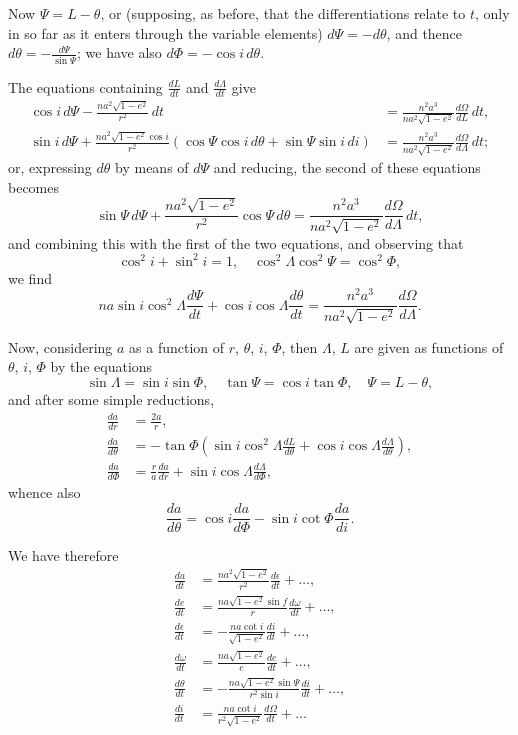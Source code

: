 \documentclass[12pt,a4paper]{article}
\theoremstyle{plain}
\begin{document}
Now $\Psi = L - \theta$, or (supposing, as before, that the differentiations relate to $t$, only in so far as it enters through the variable elements) $d\Psi = -d\theta$, and thence $d\theta = -\frac{d\Psi}{\sin\Psi}$; we have also $d\Phi = -\cos i\, d\theta$.

The equations containing $\frac{dL}{dt}$ and $\frac{d\Lambda}{dt}$ give
\begin{align*}
\cos i\, d\Psi - \frac{na^2\sqrt{1-e^2}}{r^2}\, dt &= \frac{n^2a^3}{na^2\sqrt{1-e^2}}\frac{d\Omega}{dL}\, dt, \\
\sin i\, d\Psi + \frac{na^2\sqrt{1-e^2}\cos i}{r^2}(\cos\Psi\cos i\, d\theta + \sin\Psi\sin i\, di) &= \frac{n^2a^3}{na^2\sqrt{1-e^2}}\frac{d\Omega}{d\Lambda}\, dt;
\end{align*}
or, expressing $d\theta$ by means of $d\Psi$ and reducing, the second of these equations becomes
\[
\sin\Psi\, d\Psi + \frac{na^2\sqrt{1-e^2}}{r^2}\cos\Psi\, d\theta = \frac{n^2a^3}{na^2\sqrt{1-e^2}}\frac{d\Omega}{d\Lambda}\, dt,
\]
and combining this with the first of the two equations, and observing that
\[
\cos^2 i + \sin^2 i = 1, \quad \cos^2\Lambda\cos^2\Psi = \cos^2\Phi,
\]
we find
\[
na\sin i\cos^2\Lambda\frac{d\Psi}{dt} + \cos i\cos\Lambda\frac{d\theta}{dt} = \frac{n^2a^3}{na^2\sqrt{1-e^2}}\frac{d\Omega}{d\Lambda}.
\]

Now, considering $a$ as a function of $r$, $\theta$, $i$, $\Phi$, then $\Lambda$, $L$ are given as functions of $\theta$, $i$, $\Phi$ by the equations
\[
\sin\Lambda = \sin i\sin\Phi, \quad \tan\Psi = \cos i\tan\Phi, \quad \Psi = L - \theta,
\]
and after some simple reductions,
\begin{align*}
\frac{da}{dr} &= \frac{2a}{r}, \\
\frac{da}{d\theta} &= -\tan\Phi(\sin i\cos^2\Lambda\frac{dL}{d\theta} + \cos i\cos\Lambda\frac{d\Lambda}{d\theta}), \\
\frac{da}{d\Phi} &= \frac{r}{a}\frac{da}{dr} + \sin i\cos\Lambda\frac{d\Lambda}{d\Phi},
\end{align*}
whence also
\[
\frac{da}{d\theta} = \cos i\frac{da}{d\Phi} - \sin i\cot\Phi\frac{da}{di}.
\]

We have therefore
\begin{align*}
\frac{da}{dt} &= \frac{na^2\sqrt{1-e^2}}{r^2}\frac{d\epsilon}{dt} + \ldots, \\
\frac{de}{dt} &= \frac{na\sqrt{1-e^2}\sin f}{r}\frac{d\omega}{dt} + \ldots, \\
\frac{d\epsilon}{dt} &= -\frac{na\cot i}{\sqrt{1-e^2}}\frac{di}{dt} + \ldots, \\
\frac{d\omega}{dt} &= \frac{na\sqrt{1-e^2}}{e}\frac{de}{dt} + \ldots, \\
\frac{d\theta}{dt} &= -\frac{na\sqrt{1-e^2}\sin\Psi}{r^2\sin i}\frac{di}{dt} + \ldots, \\
\frac{di}{dt} &= \frac{na\cot i}{r^2\sqrt{1-e^2}}\frac{d\Omega}{dt} + \ldots
\end{align*}
\end{document}
